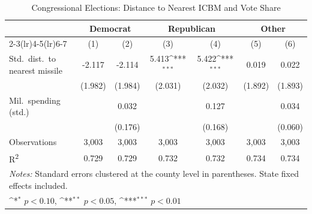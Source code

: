 \begin{table}[htbp]\centering
\setlength{\tabcolsep}{5pt}
\small
\def\sym#1{\ifmmode^{#1}\else\(^{#1}\)\fi}
\caption{Congressional Elections: Distance to Nearest ICBM and Vote Share}
\begin{tabular}{l*{6}{c}}
\toprule
                    &\multicolumn{2}{c}{Democrat}&\multicolumn{2}{c}{Republican}&\multicolumn{2}{c}{Other}\\
\cmidrule(lr){2-3}\cmidrule(lr){4-5}\cmidrule(lr){6-7}
                    &\multicolumn{1}{c}{(1)}&\multicolumn{1}{c}{(2)}&\multicolumn{1}{c}{(3)}&\multicolumn{1}{c}{(4)}&\multicolumn{1}{c}{(5)}&\multicolumn{1}{c}{(6)}\\
\midrule
Std.\ dist.\ to nearest missile
                    &      -2.117         &      -2.114         &       5.413\sym{***}&       5.422\sym{***}&       0.019         &       0.022         \\
                    &     (1.982)         &     (1.984)         &     (2.031)         &     (2.032)         &     (1.892)         &     (1.893)         \\
Mil.\ spending (std.)
                    &                     &       0.032         &                     &       0.127         &                     &       0.034         \\
                    &                     &     (0.176)         &                     &     (0.168)         &                     &     (0.060)         \\
\midrule
Observations        &       3,003         &       3,003         &       3,003         &       3,003         &       3,003         &       3,003         \\
R\textsuperscript{2}&       0.729         &       0.729         &       0.732         &       0.732         &       0.734         &       0.734         \\
\bottomrule
\multicolumn{7}{l}{\footnotesize \textit{Notes:} Standard errors clustered at the county level in parentheses. State fixed effects included.}\\
\multicolumn{7}{l}{\footnotesize \sym{*} \(p<0.10\), \sym{**} \(p<0.05\), \sym{***} \(p<0.01\)}\\
\end{tabular}
\end{table}
